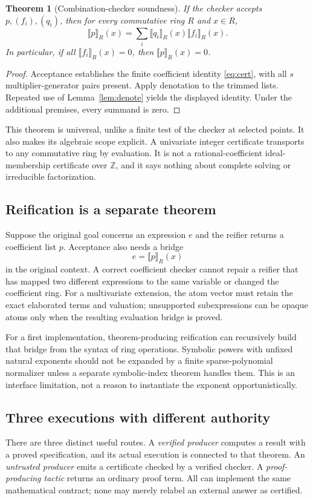 \documentclass[11pt,letterpaper]{article}
\newcommand{\Z}{\mathbb Z}
\newcommand{\sem}[1]{\llbracket #1\rrbracket}
\newtheorem{theorem}{Theorem}[section]
\theoremstyle{definition}
\theoremstyle{remark}
\begin{document}
\begin{theorem}[Combination-checker soundness]\label{thm:checker}
If the checker accepts $p,(f_i),(q_i)$, then for every commutative ring $R$ and
$x\in R$,
\[
            \sem p_R(x)=\sum_i\sem{q_i}_R(x)\sem{f_i}_R(x).
\]
In particular, if all $\sem{f_i}_R(x)=0$, then $\sem p_R(x)=0$.
\end{theorem}
\begin{proof}
Acceptance establishes the finite coefficient identity \eqref{eq:cert}, with
all $s$ multiplier-generator pairs present. Apply denotation to the trimmed
lists. Repeated use of Lemma~\ref{lem:denote} yields the displayed identity.
Under the additional premises, every summand is zero.
\end{proof}
This theorem is universal, unlike a finite test of the checker at selected
points. It also makes its algebraic scope explicit. A univariate integer
certificate transports to any commutative ring by evaluation. It is not a
rational-coefficient ideal-membership certificate over $\Z$, and it says nothing
about complete solving or irreducible factorization.

\subsection{Reification is a separate theorem}
Suppose the original goal concerns an expression $e$ and the reifier returns a
coefficient list $p$. Acceptance also needs a bridge
\[
                           e=\sem p_R(x)
\]
in the original context. A correct coefficient checker cannot repair a reifier
that has mapped two different expressions to the same variable or changed the
coefficient ring. For a multivariate extension, the atom vector must retain the
exact elaborated terms and valuation; unsupported subexpressions can be opaque
atoms only when the resulting evaluation bridge is proved.

For a first implementation, theorem-producing reification can recursively
build that bridge from the syntax of ring operations. Symbolic powers with
unfixed natural exponents should not be expanded by a finite sparse-polynomial
normalizer unless a separate symbolic-index theorem handles them. This is an
interface limitation, not a reason to instantiate the exponent opportunistically.

\subsection{Three executions with different authority}
There are three distinct useful routes. A \emph{verified producer} computes a
result with a proved specification, and its actual execution is connected to
that theorem. An \emph{untrusted producer} emits a certificate checked by a
verified checker. A \emph{proof-producing tactic} returns an ordinary proof term.
All can implement the same mathematical contract; none may merely relabel an
external answer as certified.
\end{document}

